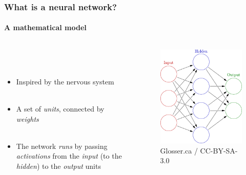 \documentclass{beamer}
\newcommand{\figheight}{0.72\textheight}
\begin{document}
\begin{frame}
\frametitle{What is a neural network?}
\framesubtitle{A mathematical model}
 \begin{columns}[T]
    \begin{column}{.45\textwidth} 
     \ \\ 
     \ \\
\begin{itemize}
\item Inspired by the nervous system \\ \
 \item A set of \emph{units}, connected by \emph{weights} \\ \
\item The network \emph{runs} by passing \emph{activations} from the \emph{input} (to the \emph{hidden}) to the \emph{output} units \\ \
\end{itemize}
\end{column}
\begin{column}{.55\textwidth}
\begin{figure}
 \begin{flushleft}

 \includegraphics[height = \figheight]{./fig/3-layer.pdf}
 \end{flushleft}
 \caption{Glosser.ca / CC-BY-SA-3.0}
\end{figure}
\end{column}

\end{columns}
\end{frame}
\end{document}
